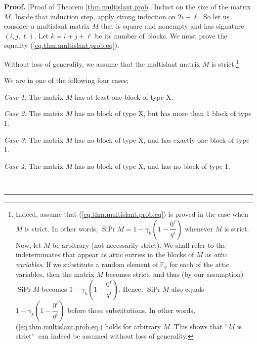 \documentclass[numbers=enddot,12pt,final,onecolumn,notitlepage]{scrartcl}%
\theoremstyle{definition}
\newenvironment{proof}[1][Proof]{\noindent\textbf{#1.} }{\ \rule{0.5em}{0.5em}}
\newcommand{\Fq}{\mathbb{F}_q}
\theoremstyle{plainsl}
\begin{document}
\begin{proof}
[Proof of Theorem \ref{thm.multislant.prob}.]Induct on the size of the matrix
$M$. Inside that induction step, apply strong induction on $2i+\ell$. So let
us consider a multislant matrix $M$ that is square and nonempty and has
signature $\left(  i,j,\ell\right)  $. Let $k=i+j+\ell$ be its number of
blocks. We must prove the equality (\ref{eq.thm.multislant.prob.eq}).

Without loss of generality, we assume that the multislant matrix $M$ is
strict.\footnote{Indeed,
assume that (\ref{eq.thm.multislant.prob.eq}) is proved in the case when $M$
is strict. In other words, $\operatorname*{SiPr}M=1-\gamma_{k}\left(
1-\dfrac{0^{\ell}}{q^{i}}\right)  $ whenever $M$ is strict. Now, let $M$ be
arbitrary (not necessarily strict). We shall refer to the indeterminates that
appear as attic entries in the blocks of $M$ as \emph{attic variables}. If we
substitute a random element of $\Fq$ for each of the attic
variables, then the matrix $M$ becomes strict, and thus (by our assumption)
$\operatorname*{SiPr}M$ becomes $1-\gamma_{k}\left(  1-\dfrac{0^{\ell}}{q^{i}%
}\right)  $. Hence, $\operatorname*{SiPr}M$ also equals $1-\gamma_{k}\left(
1-\dfrac{0^{\ell}}{q^{i}}\right)  $ before these substitutions. In other
words, (\ref{eq.thm.multislant.prob.eq}) holds for arbitrary $M$. This shows
that \textquotedblleft$M$ is strict\textquotedblright\ can indeed be assumed
without loss of generality.}

We are in one of the following four cases:

\textit{Case 1:} The matrix $M$ has at least one block of type X.

\textit{Case 2:} The matrix $M$ has no block of type X, but has more than $1$
block of type 1.

\textit{Case 3:} The matrix $M$ has no block of type X, and has exactly one
block of type 1.

\textit{Case 4:} The matrix $M$ has no block of type X, and has no block of
type 1.


\end{proof}
\end{document}
